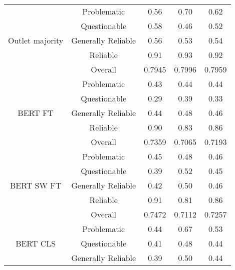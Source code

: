 \begin{table}[htbp]
\begin{tabular}{| c | c | c | c | c |}
        \hline
        \multirow{5}{*}{Outlet majority}         & Problematic        & 0.56      & 0.70   & 0.62   \\
                                                 & Questionable       & 0.58      & 0.46   & 0.52   \\
                                                 & Generally Reliable & 0.56      & 0.53   & 0.54   \\
                                                 & Reliable           & 0.91      & 0.93   & 0.92   \\
                                                 & Overall            & 0.7945    & 0.7996 & 0.7959 \\
        \hline
        \multirow{5}{*}{BERT FT}                 & Problematic        & 0.43      & 0.44   & 0.44   \\
                                                 & Questionable       & 0.29      & 0.39   & 0.33   \\
                                                 & Generally Reliable & 0.44      & 0.48   & 0.46   \\
                                                 & Reliable           & 0.90      & 0.83   & 0.86   \\
                                                 & Overall            & 0.7359    & 0.7065 & 0.7193 \\
        \hline
        \multirow{5}{*}{BERT SW FT}              & Problematic        & 0.45      & 0.48   & 0.46   \\
                                                 & Questionable       & 0.39      & 0.52   & 0.45   \\
                                                 & Generally Reliable & 0.42      & 0.50   & 0.46   \\
                                                 & Reliable           & 0.91      & 0.81   & 0.86   \\
                                                 & Overall            & 0.7472    & 0.7112 & 0.7257 \\
        \hline
        \multirow{5}{*}{BERT CLS}                & Problematic        & 0.44      & 0.67   & 0.53   \\
                                                 & Questionable       & 0.41      & 0.48   & 0.44   \\
                                                 & Generally Reliable & 0.39      & 0.50   & 0.44   \\

\end{tabular}
\end{table}
